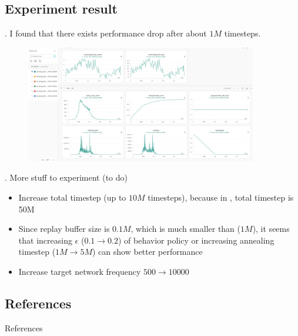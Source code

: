 \documentclass[8pt]{beamer}
\begin{document}
\subsection{Experiment result}

\begin{frame}{.}
    I found that there exists performance drop after about $1M$ timesteps.
    \begin{figure}
        \includegraphics[width=0.9\textwidth]{DuelingDQNExp1_1.png}
    \end{figure}
\end{frame}

\begin{frame}{.}
    More stuff to experiment (to do)
    \begin{itemize}
        \item Increase total timestep (up to $10M$ timesteps), because in \cite{mnih2015human}, total timestep is 50M
        \item Since replay buffer size is $0.1M$, which is much smaller than \cite{mnih2015human} ($1M$), it seems that increasing $\epsilon$ ($0.1 \rightarrow 0.2$) of behavior policy or increasing annealing timestep ($1M \rightarrow 5M$) can show better performance
        \item Increase target network frequency $500 \rightarrow 10000$
    \end{itemize}
\end{frame}

\subsection{References}
\begin{frame}[allowframebreaks]{References}
  \printbibliography
\end{frame}
\end{document}

